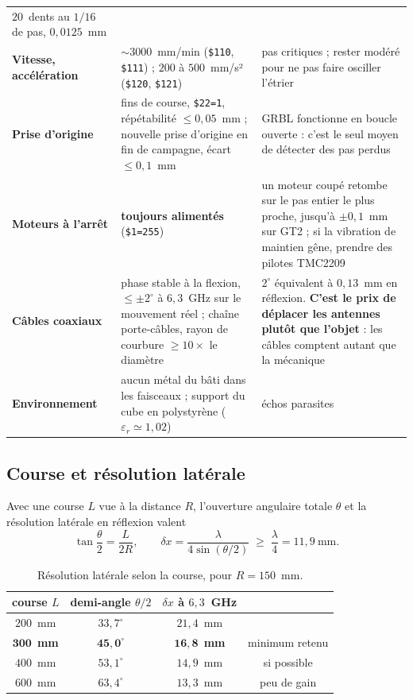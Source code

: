 \documentclass[11pt,a4paper]{article}
\newcommand{\eps}{\varepsilon_r}
\begin{document}
\begin{longtable}{>{\raggedright\arraybackslash}p{3.3cm}
                  >{\raggedright\arraybackslash}p{5.0cm}
                  >{\raggedright\arraybackslash}p{6.3cm}}
  $20$~dents au $1/16$ de pas, $0{,}0125$~mm \\
\addlinespace
\textbf{Vitesse, accélération} & $\sim 3000$~mm/min (\texttt{\$110},
  \texttt{\$111}) ; $200$ à $500$~mm/s² (\texttt{\$120}, \texttt{\$121}) & pas
  critiques ; rester modéré pour ne pas faire osciller l'étrier \\
\addlinespace
\textbf{Prise d'origine} & fins de course, \texttt{\$22=1}, répétabilité
  $\le 0{,}05$~mm ; nouvelle prise d'origine en fin de campagne, écart
  $\le 0{,}1$~mm & GRBL fonctionne en boucle ouverte : c'est le seul moyen de
  détecter des pas perdus \\
\addlinespace
\textbf{Moteurs à l'arrêt} & \textbf{toujours alimentés} (\texttt{\$1=255}) &
  un moteur coupé retombe sur le pas entier le plus proche, jusqu'à
  $\pm 0{,}1$~mm sur GT2 ; si la vibration de maintien gêne, prendre des
  pilotes TMC2209 \\
\addlinespace
\textbf{Câbles coaxiaux} & phase stable à la flexion, $\le \pm 2^\circ$ à
  $6{,}3$~GHz sur le mouvement réel ; chaîne porte-câbles, rayon de courbure
  $\ge 10\times$ le diamètre & $2^\circ$ équivalent à $0{,}13$~mm en réflexion.
  \textbf{C'est le prix de déplacer les antennes plutôt que l'objet} : les
  câbles comptent autant que la mécanique \\
\addlinespace
\textbf{Environnement} & aucun métal du bâti dans les faisceaux ; support du
  cube en polystyrène ($\eps \simeq 1{,}02$) & échos parasites \\
\end{longtable}

\subsection{Course et résolution latérale}
\label{sec:course}

Avec une course $L$ vue à la distance $R$, l'ouverture angulaire totale $\theta$
et la résolution latérale en réflexion valent
\[
  \tan\frac{\theta}{2} = \frac{L}{2R}, \qquad
  \delta x = \frac{\lambda}{4\sin(\theta/2)} \;\ge\; \frac{\lambda}{4}
  = 11{,}9~\text{mm}.
\]

\begin{table}[H]
\centering
\begin{tabular}{cccc}
\toprule
course $L$ & demi-angle $\theta/2$ & $\delta x$ à $6{,}3$~GHz & \\
\midrule
$200$~mm & $33{,}7^\circ$ & $21{,}4$~mm & \\
$\mathbf{300}$~\textbf{mm} & $\mathbf{45{,}0^\circ}$ & $\mathbf{16{,}8}$~\textbf{mm}
  & minimum retenu \\
$400$~mm & $53{,}1^\circ$ & $14{,}9$~mm & si possible \\
$600$~mm & $63{,}4^\circ$ & $13{,}3$~mm & peu de gain \\
\bottomrule
\end{tabular}
\caption{Résolution latérale selon la course, pour $R = 150$~mm.}
\label{tab:course}
\end{table}
\end{document}
